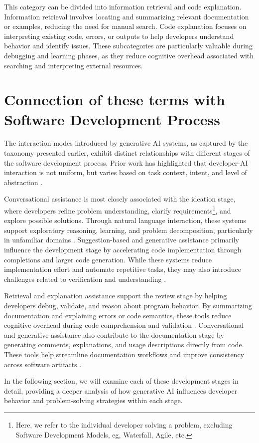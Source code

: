 This category can be divided into information retrieval and code explanation. Information retrieval involves locating and summarizing relevant documentation or examples, reducing the need for manual search. Code explanation focuses on interpreting existing code, errors, or outputs to help developers understand behavior and identify issues. These subcategories are particularly valuable during debugging and learning phases, as they reduce cognitive overhead associated with searching and interpreting external resources.

\section{Connection of these terms with Software Development Process}
The interaction modes introduced by generative AI systems, as captured by the taxonomy presented earlier, exhibit distinct relationships with different stages of the software development process. Prior work has highlighted that developer-AI interaction is not uniform, but varies based on task context, intent, and level of abstraction \cite{mohammadkhani2023systematic, crawford2023aisesurvey}.

Conversational assistance is most closely associated with the ideation stage, where developers refine problem understanding, clarify requirements\footnote{Here, we refer to the individual developer solving a problem, excluding Software Development Models, eg, Waterfall, Agile, etc.}, and explore possible solutions. Through natural language interaction, these systems support exploratory reasoning, learning, and problem decomposition, particularly in unfamiliar domains \cite{yang2025llmworkflows, crawford2023aisesurvey}. Suggestion-based and generative assistance primarily influence the development stage by accelerating code implementation through completions and larger code generation. While these systems reduce implementation effort and automate repetitive tasks, they may also introduce challenges related to verification and understanding \cite{nijkamp2022codegen, li2023competition}.

Retrieval and explanation assistance support the review stage by helping developers debug, validate, and reason about program behavior. By summarizing documentation and explaining errors or code semantics, these tools reduce cognitive overhead during code comprehension and validation \cite{mohammadkhani2023systematic}. Conversational and generative assistance also contribute to the documentation stage by generating comments, explanations, and usage descriptions directly from code. These tools help streamline documentation workflows and improve consistency across software artifacts \cite{yang2025llmworkflows}.

In the following section, we will examine each of these development stages in detail, providing a deeper analysis of how generative AI influences developer behavior and problem-solving strategies within each stage.